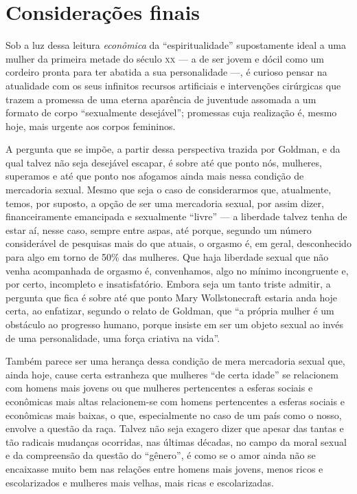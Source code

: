 \section{Considerações finais}

Sob a luz dessa leitura \emph{econômica} da ``espiritualidade''
supostamente ideal a uma mulher da primeira metade do século \textsc{xx} --- a de
ser jovem e dócil como um cordeiro pronta para ter abatida a sua
personalidade ---, é curioso pensar na atualidade com os seus infinitos
recursos artificiais e intervenções cirúrgicas que trazem a promessa de
uma eterna aparência de juventude assomada a um formato de corpo
``sexualmente desejável''; promessas cuja realização é, mesmo hoje, mais
urgente aos corpos femininos.

A pergunta que se impõe, a partir dessa
perspectiva trazida por Goldman, e da qual talvez não seja desejável
escapar, é sobre até que ponto nós, mulheres, superamos e até que
ponto nos afogamos ainda mais nessa condição de mercadoria sexual. Mesmo
que seja o caso de considerarmos que, atualmente, temos, por suposto, a
opção de ser uma mercadoria sexual, por assim dizer, financeiramente
emancipada e sexualmente ``livre'' --- a liberdade talvez tenha de estar
aí, nesse caso, sempre entre aspas, até porque, segundo um número
considerável de pesquisas mais do que atuais, o orgasmo é, em geral,
desconhecido para algo em torno de 50\% das mulheres. Que haja liberdade
sexual que não venha acompanhada de orgasmo é, convenhamos, algo no
mínimo incongruente e, por certo, incompleto e insatisfatório. Embora
seja um tanto triste admitir, a pergunta que fica é sobre até que
ponto Mary Wollstonecraft estaria anda hoje certa, ao enfatizar, segundo
o relato de Goldman, que ``a própria mulher é um obstáculo ao progresso
humano, porque insiste em ser um objeto sexual ao invés de uma
personalidade, uma força criativa na vida''.

Também parece ser uma herança dessa condição de mera mercadoria sexual
que, ainda hoje, cause certa estranheza que mulheres ``de certa idade''
se relacionem com homens mais jovens ou que mulheres pertencentes a
esferas sociais e econômicas mais altas relacionem-se com homens
pertencentes a esferas sociais e econômicas mais baixas, o que,
especialmente no caso de um país como o nosso, envolve a questão da
raça. Talvez não seja exagero dizer que apesar das tantas e tão radicais
mudanças ocorridas, nas últimas décadas, no campo da moral sexual e da
compreensão da questão do ``gênero'', é como se o amor ainda não se
encaixasse muito bem nas relações entre homens mais jovens, menos ricos
e escolarizados e mulheres mais velhas, mais ricas e escolarizadas.


